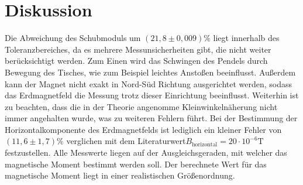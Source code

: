 \section{Diskussion}
\label{sec:Diskussion}

Die Abweichung des Schubmoduls um $(21,8 \pm 0,009)\%$ liegt innerhalb des Toleranzbereiches, da es mehrere Messunsicherheiten gibt, die nicht weiter berücksichtigt werden. Zum Einen wird das Schwingen des Pendels durch Bewegung des Tisches, wie zum Beispiel leichtes Anstoßen beeinflusst. Außerdem kann der Magnet nicht exakt in Nord-Süd Richtung ausgerichtet werden, sodass das Erdmagnetfeld die Messung trotz dieser Einrichtung beeinflusst. Weiterhin ist zu beachten, dass die in der Theorie angenomme Kleinwinkelnäherung nicht immer angehalten wurde, was zu weiteren Fehlern führt.
Bei der Bestimmung der Horizontalkomponente des Erdmagnetfelds ist lediglich ein kleiner Fehler von $(11,6 \pm 1,7)\%$ verglichen mit dem Literaturwert$B_\mathrm{horizontal} = 20 \cdot 10^{-6} \si{\tesla}$  \cite{dornbader} festzustellen.
Alle Messwerte liegen auf der Ausgleichsgeraden, mit welcher das magnetische Moment bestimmt werden soll. Der berechnete Wert für das magnetische Moment liegt in einer realistischen Größenordnung.
